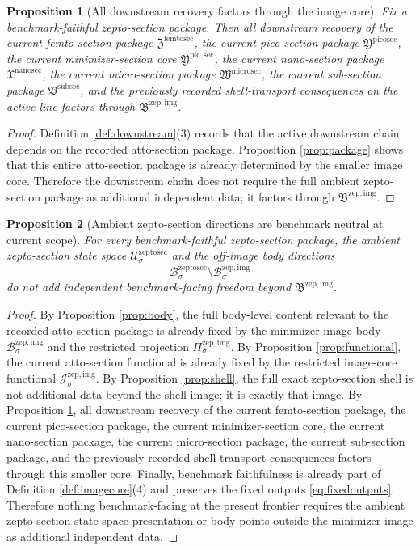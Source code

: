 \documentclass[11pt]{article}
\newcommand{\SubSectionPackage}{\mathfrak V^{\mathrm{subsec}}}
\newcommand{\MicroSectionPackage}{\mathfrak W^{\mathrm{microsec}}}
\newcommand{\NanoSectionPackage}{\mathfrak X^{\mathrm{nanosec}}}
\newcommand{\PicoSectionPackage}{\mathfrak Y^{\mathrm{picosec}}}
\newcommand{\PicoMinSectionCore}{\mathfrak Y^{\mathrm{pic,sec}}}
\newcommand{\FemtoSectionPackage}{\mathfrak Z^{\mathrm{femtosec}}}
\newcommand{\ZeptoSectionSpace}[1]{\mathcal U_{#1}^{\mathrm{zeptosec}}}
\newcommand{\ZeptoSectionBody}[1]{\mathcal B_{#1}^{\mathrm{zeptosec}}}
\newcommand{\ZeptoImageCore}{\mathfrak B^{\mathrm{zep,img}}}
\newcommand{\ZeptoImgBody}[1]{\mathcal B_{#1}^{\mathrm{zep,img}}}
\newcommand{\ZeptoImgProj}[1]{\Pi_{#1}^{\mathrm{zep,img}}}
\newcommand{\ZeptoImgFunctional}[1]{\mathscr J_{#1}^{\mathrm{zep,img}}}
\newtheorem{proposition}{Proposition}
\begin{document}
\begin{proposition}[All downstream recovery factors through the image core]
\label{prop:downstream}
Fix a benchmark-faithful zepto-section package. Then all downstream recovery of the current femto-section package \(\FemtoSectionPackage\), the current pico-section package \(\PicoSectionPackage\), the current minimizer-section core \(\PicoMinSectionCore\), the current nano-section package \(\NanoSectionPackage\), the current micro-section package \(\MicroSectionPackage\), the current sub-section package \(\SubSectionPackage\), and the previously recorded shell-transport consequences on the active line factors through \(\ZeptoImageCore\).
\end{proposition}

\begin{proof}
Definition \ref{def:downstream}(3) records that the active downstream chain depends on the recorded atto-section package. Proposition \ref{prop:package} shows that this entire atto-section package is already determined by the smaller image core. Therefore the downstream chain does not require the full ambient zepto-section package as additional independent data; it factors through \(\ZeptoImageCore\).
\end{proof}

\begin{proposition}[Ambient zepto-section directions are benchmark neutral at current scope]
\label{prop:neutral}
For every benchmark-faithful zepto-section package, the ambient zepto-section state space \(\ZeptoSectionSpace{\sigma}\) and the off-image body directions
\[
\ZeptoSectionBody{\sigma}\setminus\ZeptoImgBody{\sigma}
\]
do not add independent benchmark-facing freedom beyond \(\ZeptoImageCore\).
\end{proposition}

\begin{proof}
By Proposition \ref{prop:body}, the full body-level content relevant to the recorded atto-section package is already fixed by the minimizer-image body \(\ZeptoImgBody{\sigma}\) and the restricted projection \(\ZeptoImgProj{\sigma}\). By Proposition \ref{prop:functional}, the current atto-section functional is already fixed by the restricted image-core functional \(\ZeptoImgFunctional{\sigma}\). By Proposition \ref{prop:shell}, the full exact zepto-section shell is not additional data beyond the shell image; it is exactly that image. By Proposition \ref{prop:downstream}, all downstream recovery of the current femto-section package, the current pico-section package, the current minimizer-section core, the current nano-section package, the current micro-section package, the current sub-section package, and the previously recorded shell-transport consequences factors through this smaller core. Finally, benchmark faithfulness is already part of Definition \ref{def:imagecore}(4) and preserves the fixed outputs \eqref{eq:fixedoutputs}. Therefore nothing benchmark-facing at the present frontier requires the ambient zepto-section state-space presentation or body points outside the minimizer image as additional independent data.
\end{proof}
\end{document}
